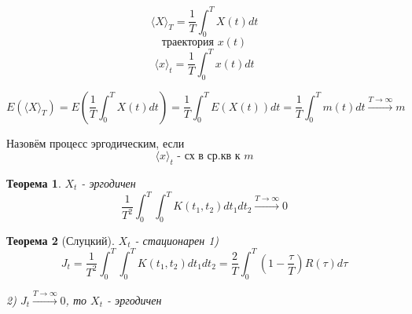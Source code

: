 \documentclass[a4paper]{article}
\newtheorem{theorem}{Теорема}
\theoremstyle{definition}
\begin{document}
\begin{equation}
    \langle X \rangle_T = \frac{1}{T} \int_{0}^{T} X(t) dt
\end{equation}
\[
    \text{траектория } x(t)
\]
\[
    \langle x \rangle_t = \frac{1}{T} \int_{0}^{T} x(t) dt
\]

\[
    E(\langle X \rangle_T) = E\left(\frac{1}{T} \int_{0}^{T} X(t) dt \right) =
    \frac{1}{T} \int_{0}^{T} E(X(t)) dt = \frac{1}{T} \int_{0}^{T} m(t)dt 
    \xrightarrow{T \to \infty} m
\]

Назовём процесс эргодическим, если 
\[
    \langle x \rangle_t \text{ - сх в ср.кв к } m
\]

\begin{tcolorbox}
\begin{theorem}
    $ X_t $ - эргодичен
    \[
        \frac{1}{T^2} \int_{0}^{T} \int_{0}^{T} K(t_1, t_2) d t_1 d t_2
        \xrightarrow{T \to \infty} 0
    \]
\end{theorem}
\end{tcolorbox}

\begin{tcolorbox}
    \begin{theorem}[Слуцкий]
        $ X_t $ - стационарен
        1)
        \[
            J_t = \frac{1}{T^2} \int_{0}^{T} \int_{0}^{T} K(t_1, t_2) d t_1 d t_2
            = \frac{2}{T} \int_{0}^{T} \left(1 - \frac{\tau}{T} \right) R(\tau)
            d \tau
        \]

        2) $ J_t \xrightarrow{T \to \infty} 0 $, то $ X_t $ - эргодичен 
    \end{theorem}
\end{tcolorbox}
\end{document}
